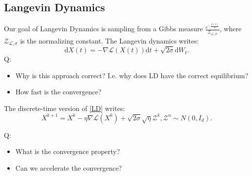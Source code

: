 \subsection{Langevin Dynamics}
Our goal of Langevin Dynamics is sampling from a Gibbs measure $\frac{e^{-\frac{\mathcal{L}(x)}{\sigma}}}{\mathcal{Z}_{\mathcal{L},\sigma}}$, where $\mathcal{Z}_{\mathcal{L},\sigma}$ is the normalizing constant.
The Langevin dynamics writes:
\begin{equation}
    \mathrm{d}X(t) = -\nabla\mathcal{L}(X(t))\mathrm{d}t+\sqrt{2\sigma}\mathrm{d} W_t.\tag{LD}
    \label{LD}
\end{equation}
Q: 
\begin{itemize}
    \item Why is this approach correct? I.e. why does LD have the correct equilibrium?
    \item How fast is the convergence?
\end{itemize}

The discrete-time version of \ref{LD} writes:
\begin{equation}
    X^{k+1} = X^k - \eta \nabla \mathcal{L}(X^k) + \sqrt{2\sigma}\sqrt{\eta}\mathcal{Z} ^k,\mathcal{Z}^n\sim N(0,I_d).\tag{LD-discrete}
\end{equation}

Q: 
\begin{itemize}
    \item What is the convergence property?
    \item Can we accelerate the convergence?
\end{itemize}
